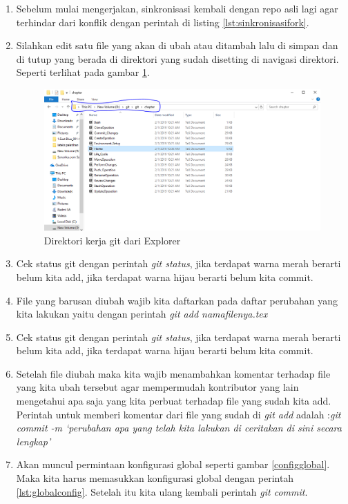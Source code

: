 \begin{enumerate}

\item Sebelum mulai mengerjakan, sinkronisasi kembali dengan repo asli lagi agar terhindar dari konflik dengan perintah di listing \ref{lst:sinkronisasifork}.

\item Silahkan edit satu file yang akan di ubah atau ditambah lalu di simpan dan di tutup yang berada di direktori yang sudah disetting di navigasi direktori. Seperti terlihat pada gambar \ref{penanda}.
    \begin{figure}[!htbp]
        \centering
            \includegraphics[width=.75\textwidth]{Figures/Capture}
            \caption{Direktori kerja git dari Explorer}
        \label{penanda}
    \end{figure}
\item Cek status git dengan perintah \textit{git status}, jika terdapat warna merah berarti belum kita add, jika terdapat warna hijau berarti belum kita commit.
\item File yang barusan diubah wajib kita daftarkan pada daftar perubahan yang kita lakukan yaitu dengan perintah \textit{git add namafilenya.tex}
\item Cek status git dengan perintah \textit{git status}, jika terdapat warna merah berarti belum kita add, jika terdapat warna hijau berarti belum kita commit.
\item Setelah file diubah maka kita wajib menambahkan komentar terhadap file yang kita ubah tersebut agar mempermudah kontributor yang lain mengetahui apa saja yang kita perbuat terhadap file yang sudah kita add. Perintah untuk memberi komentar dari file yang sudah di \textit{git add} adalah :\textit{git commit -m `perubahan apa yang telah kita lakukan di ceritakan di sini secara lengkap'}
\item Akan muncul permintaan konfigurasi global seperti gambar \ref{configglobal}. Maka kita harus memasukkan konfigurasi global dengan perintah \ref{lst:globalconfig}. Setelah itu kita ulang kembali perintah \textit{git commit}.

\end{enumerate}
